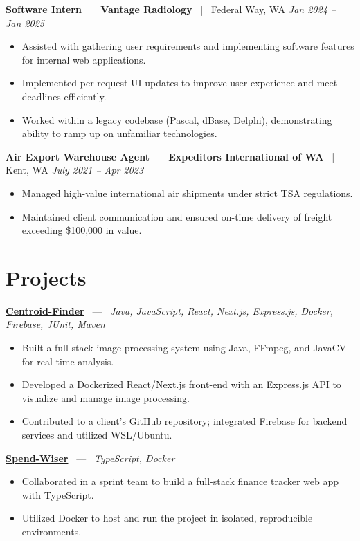 \documentclass[10pt, letterpaper]{article}
\newcommand{\jobhead}[4]{%
  \vspace{5pt}%
  {\bfseries\color{dark}#1}%
  ~{\color{light}|}~%
  {\bfseries\color{navy}#2}%
  ~{\color{light}|}~%
  {\color{light}#3}%
  \hfill{\color{light}\small\textit{#4}}\\[-2pt]%
}
\newcommand{\projhead}[3]{%
  \vspace{5pt}%
  {\bfseries\color{dark}\href{#2}{#1}}%
  ~{\color{light}---}~%
  {\color{light}\small\textit{#3}}\\[-2pt]%
}
\begin{document}
\jobhead{Software Intern}{Vantage Radiology}{Federal Way, WA}{Jan 2024 – Jan 2025}
\begin{itemize}
  \item Assisted with gathering user requirements and implementing software features for internal web applications.
  \item Implemented per-request UI updates to improve user experience and meet deadlines efficiently.
  \item Worked within a legacy codebase (Pascal, dBase, Delphi), demonstrating ability to ramp up on unfamiliar technologies.
\end{itemize}

\jobhead{Air Export Warehouse Agent}{Expeditors International of WA}{Kent, WA}{July 2021 – Apr 2023}
\begin{itemize}
  \item Managed high-value international air shipments under strict TSA regulations.
  \item Maintained client communication and ensured on-time delivery of freight exceeding \$100,000 in value.
\end{itemize}

\section{Projects}

\projhead{Centroid-Finder}{https://github.com/xavierb117/centroid-finder}{Java, JavaScript, React, Next.js, Express.js, Docker, Firebase, JUnit, Maven}
\begin{itemize}
  \item Built a full-stack image processing system using Java, FFmpeg, and JavaCV for real-time analysis.
  \item Developed a Dockerized React/Next.js front-end with an Express.js API to visualize and manage image processing.
  \item Contributed to a client's GitHub repository; integrated Firebase for backend services and utilized WSL/Ubuntu.
\end{itemize}

\projhead{Spend-Wiser}{https://github.com/JesseChum/w26-sdev372-spendwiser-finance-tracker}{TypeScript, Docker}
\begin{itemize}
  \item Collaborated in a sprint team to build a full-stack finance tracker web app with TypeScript.
  \item Utilized Docker to host and run the project in isolated, reproducible environments.
\end{itemize}
\end{document}

